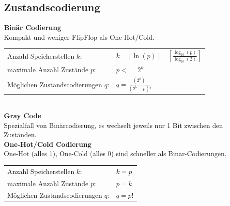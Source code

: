 \subsection{Zustandscodierung}
\noindent\textbf{Binär Codierung}\\
Kompakt und weniger FlipFlop als One-Hot/Cold.

\begin{tabular}{ll}
Anzahl Speicherstellen $k$:& $k = \lceil\ln(p)\rceil = \left\lceil \frac{\log_{10}(p)}{\log_{10}(2)}\right\rceil$\\
maximale Anzahl Zustände $p$:& $p <= 2^k$ \\
Möglichen Zustandscodierungen $q$:& $q = \frac{(2^k)!}{(2^k - p)!}$ 
\end{tabular}\\ 

\noindent\textbf{Gray Code}\\ 
Spezialfall von Binärcodierung, es wechselt jeweils nur 1 Bit zwischen den Zuständen. \\

\noindent\textbf{One-Hot/Cold Codierung}\\
One-Hot (alles 1), One-Cold (alles 0) sind schneller als Binär-Codierungen.

\begin{tabular}{ll}
	Anzahl Speicherstellen $k$:& $k = p$\\
	maximale Anzahl Zustände $p$:& $p = k$ \\
	Möglichen Zustandscodierungen $q$:& $q = p!$ 
\end{tabular}
